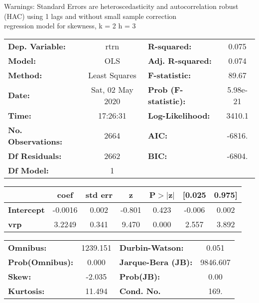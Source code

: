 Warnings: \newline
 [1] Standard Errors are heteroscedasticity and autocorrelation robust (HAC) using 1 lags and without small sample correction\\ 

regression model for skewness, k = 2 h = 3\begin{center}
\begin{tabular}{lclc}
\toprule
\textbf{Dep. Variable:}    &       rtrn       & \textbf{  R-squared:         } &     0.075   \\
\textbf{Model:}            &       OLS        & \textbf{  Adj. R-squared:    } &     0.074   \\
\textbf{Method:}           &  Least Squares   & \textbf{  F-statistic:       } &     89.67   \\
\textbf{Date:}             & Sat, 02 May 2020 & \textbf{  Prob (F-statistic):} &  5.98e-21   \\
\textbf{Time:}             &     17:26:31     & \textbf{  Log-Likelihood:    } &    3410.1   \\
\textbf{No. Observations:} &        2664      & \textbf{  AIC:               } &    -6816.   \\
\textbf{Df Residuals:}     &        2662      & \textbf{  BIC:               } &    -6804.   \\
\textbf{Df Model:}         &           1      & \textbf{                     } &             \\
\bottomrule
\end{tabular}
\begin{tabular}{lcccccc}
                   & \textbf{coef} & \textbf{std err} & \textbf{z} & \textbf{P$> |$z$|$} & \textbf{[0.025} & \textbf{0.975]}  \\
\midrule
\textbf{Intercept} &      -0.0016  &        0.002     &    -0.801  &         0.423        &       -0.006    &        0.002     \\
\textbf{vrp}       &       3.2249  &        0.341     &     9.470  &         0.000        &        2.557    &        3.892     \\
\bottomrule
\end{tabular}
\begin{tabular}{lclc}
\textbf{Omnibus:}       & 1239.151 & \textbf{  Durbin-Watson:     } &    0.051  \\
\textbf{Prob(Omnibus):} &   0.000  & \textbf{  Jarque-Bera (JB):  } & 9846.607  \\
\textbf{Skew:}          &  -2.035  & \textbf{  Prob(JB):          } &     0.00  \\
\textbf{Kurtosis:}      &  11.494  & \textbf{  Cond. No.          } &     169.  \\
\bottomrule
\end{tabular}
\end{center}

